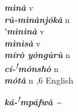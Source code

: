 \begin{multicols}{2}
{{\bfseries\itshape mìnà}} \relax  v  \relax   \relax  {} \relax   \relax  \\
{{\bfseries\itshape rù-mìnànjókà}} \relax  n   \relax  {} \relax   \relax  \\
{{\bfseries\itshape ʹmìnìnà}} \relax  v  \relax   \relax  {} \relax   \relax  \\
{{\bfseries\itshape mìnìsà}} \relax  v  \relax   \relax  {} \relax   \relax  \\
{{\bfseries\itshape mírò yóngùrù}} \relax  n   \relax  {} \relax   \relax  \\
{{\bfseries\itshape cí-\textsuperscript{!}mónshò}} \relax  n    \relax   \relax  \\
{{\bfseries\itshape mótà}} \relax  n  ,6  \relax  English \relax  \\
{{\bfseries\itshape ká-\textsuperscript{!}mpáfwà {\textasciitilde}}

}
\end{multicols}
